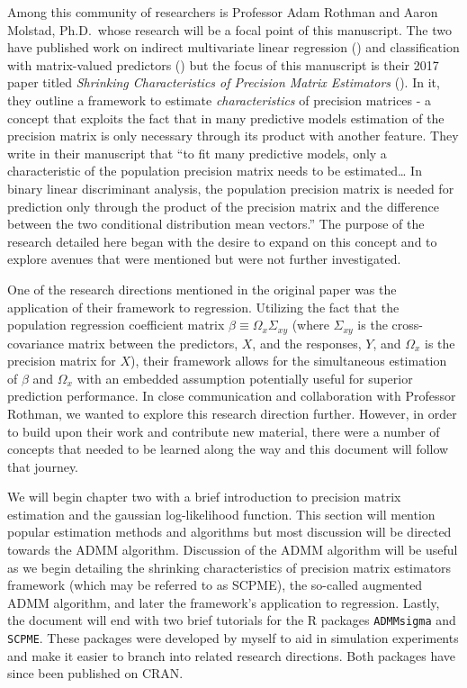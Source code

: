 \documentclass[11pt,]{report}
\theoremstyle{definition}
\theoremstyle{definition}
\theoremstyle{definition}
\theoremstyle{remark}
\begin{document}
Among this community of researchers is Professor Adam Rothman and Aaron Molstad, Ph.D.~whose research will be a focal point of this manuscript. The two have published work on indirect multivariate linear regression (\citet{molstad2016indirect}) and classification with matrix-valued predictors (\citet{molstad2018penalized}) but the focus of this manuscript is their 2017 paper titled \emph{Shrinking Characteristics of Precision Matrix Estimators} (\citet{molstad2017shrinking}). In it, they outline a framework to estimate \emph{characteristics} of precision matrices - a concept that exploits the fact that in many predictive models estimation of the precision matrix is only necessary through its product with another feature. They write in their manuscript that ``to fit many predictive models, only a characteristic of the population precision matrix needs to be estimated\ldots{} In binary linear discriminant analysis, the population precision matrix is needed for prediction only through the product of the precision matrix and the difference between the two conditional distribution mean vectors.'' The purpose of the research detailed here began with the desire to expand on this concept and to explore avenues that were mentioned but were not further investigated.

One of the research directions mentioned in the original paper was the application of their framework to regression. Utilizing the fact that the population regression coefficient matrix \(\beta \equiv \Omega_{x}\Sigma_{xy}\) (where \(\Sigma_{xy}\) is the cross-covariance matrix between the predictors, \(X\), and the responses, \(Y\), and \(\Omega_{x}\) is the precision matrix for \(X\)), their framework allows for the simultaneous estimation of \(\beta\) and \(\Omega_{x}\) with an embedded assumption potentially useful for superior prediction performance. In close communication and collaboration with Professor Rothman, we wanted to explore this research direction further. However, in order to build upon their work and contribute new material, there were a number of concepts that needed to be learned along the way and this document will follow that journey.

We will begin chapter two with a brief introduction to precision matrix estimation and the gaussian log-likelihood function. This section will mention popular estimation methods and algorithms but most discussion will be directed towards the ADMM algorithm. Discussion of the ADMM algorithm will be useful as we begin detailing the shrinking characteristics of precision matrix estimators framework (which may be referred to as SCPME), the so-called augmented ADMM algorithm, and later the framework's application to regression. Lastly, the document will end with two brief tutorials for the R packages \texttt{ADMMsigma} and \texttt{SCPME}. These packages were developed by myself to aid in simulation experiments and make it easier to branch into related research directions. Both packages have since been published on CRAN.
\end{document}
